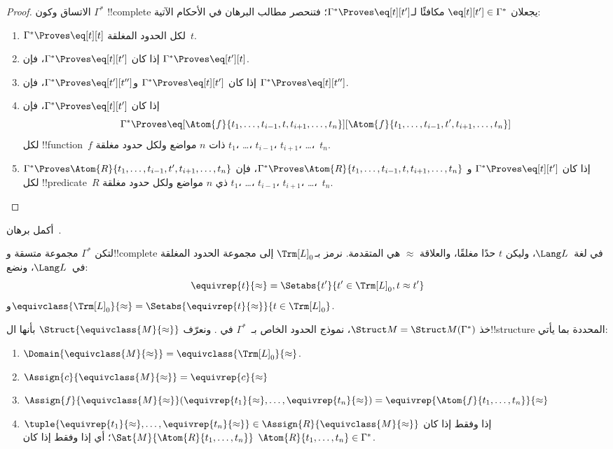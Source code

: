 \documentclass[../../../include/open-logic-section]{subfiles}
\begin{document}
\begin{proof}
الاتساق وكون $\Gamma^*$ !!{complete} يجعلان $\eq[t][t'] \in
\Gamma^*$ مكافئًا لـ$\Gamma^* \Proves \eq[t][t']$؛ فتنحصر مطالب
البرهان في الأحكام الآتية:
\begin{enumerate}
\item $\Gamma^* \Proves \eq[t][t]$ لكل الحدود المغلقة~$t$.
\item إذا كان $\Gamma^* \Proves \eq[t][t']$، فإن
  $\Gamma^* \Proves \eq[t'][t]$.
\item إذا كان $\Gamma^* \Proves \eq[t][t']$ و$\Gamma^* \Proves
  \eq[t'][t'']$، فإن $\Gamma^* \Proves \eq[t][t'']$.
\item إذا كان $\Gamma^* \Proves \eq[t][t']$، فإن
\[
\Gamma^* \Proves
\eq[\Atom{f}{t_1,\dots,t_{i-1},t,t_{i+1},\dots,t_n}][\Atom{f}{t_1,\dots,t_{i-1},t',t_{i+1},\dots,t_n}]
\]
لكل !!{function}~$f$ ذات $n$ مواضع ولكل حدود مغلقة $t_1$، \dots،
$t_{i-1}$، $t_{i+1}$، \dots،~$t_n$.
\item إذا كان $\Gamma^* \Proves \eq[t][t']$ و
$\Gamma^* \Proves
\Atom{R}{t_1,\dots,t_{i-1},t,t_{i+1},\dots,t_n}$، فإن
$\Gamma^* \Proves \Atom{R}{t_1,\dots,t_{i-1},t',t_{i+1},\dots,t_n}$
لكل !!{predicate}~$R$ ذي $n$ مواضع ولكل حدود مغلقة $t_1$، \dots،
$t_{i-1}$، $t_{i+1}$، \dots،~$t_n$.
\end{enumerate}
\end{proof}

\begin{prob}
أكمل برهان~.
\end{prob}

\begin{defn}
لتكن $\Gamma^*$ مجموعة متسقة و!!{complete} في لغة~$\Lang L$، وليكن
$t$ حدًا مغلقًا، والعلاقة $\approx$ هي المتقدمة. نرمز بـ$\Trm[L]_0$
إلى مجموعة الحدود المغلقة في~$\Lang L$، ونضع:
\[
\equivrep{t}{\approx} = \Setabs{t'}{t'\in \Trm[L]_0, t \approx t'}
\]
و$\equivclass{\Trm[L]_0}{\approx} = \Setabs{\equivrep{t}{\approx}}{t \in \Trm[L]_0}$.
\end{defn}

\begin{defn}
خذ $\Struct M = \Struct M(\Gamma^*)$، نموذج الحدود الخاص بـ~$\Gamma^*$
في . ونعرّف
$\Struct{\equivclass{M}{\approx}}$ بأنها ال!!{structure} المحددة بما يأتي:
\begin{enumerate}
\item $\Domain{\equivclass{M}{\approx}} = \equivclass{\Trm[L]_0}{\approx}$.
\item $\Assign{c}{\equivclass{M}{\approx}} = \equivrep{c}{\approx}$
\item $\Assign{f}{\equivclass{M}{\approx}}(\equivrep{t_1}{\approx}, \dots,
  \equivrep{t_n}{\approx}) = \equivrep{\Atom{f}{t_1,\dots, t_n}}{\approx}$
\item $\tuple{\equivrep{t_1}{\approx}, \dots, \equivrep{t_n}{\approx}} \in
  \Assign{R}{\equivclass{M}{\approx}}$ إذا وفقط إذا كان
  $\Sat{M}{\Atom{R}{t_1,\dots, t_n}}$؛ أي إذا وفقط إذا كان
  $\Atom{R}{t_1,\dots, t_n} \in \Gamma^*$.
\end{enumerate}
\end{defn}
\end{document}
